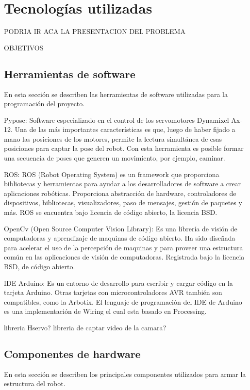 \chapter{Tecnologías utilizadas}\label{chapter:presentacion_del_problema}

 PODRIA IR ACA LA PRESENTACION DEL PROBLEMA
 
 OBJETIVOS
 
\section{ Herramientas de software}
En esta sección se describen las herramientas de software utilizadas para la programación del proyecto.

Pypose: Software especializado en el control de los servomotores Dynamixel Ax-12. Una de las más importantes características es que, luego de haber fijado a mano las posiciones de los motores, permite la lectura simultánea de esas posiciones para captar la pose del robot. Con esta herramienta es posible formar una secuencia de poses que generen un movimiento, por ejemplo, caminar. %

ROS: ROS (Robot Operating System) es un framework que proporciona bibliotecas y herramientas para ayudar a los desarrolladores de software a crear aplicaciones robóticas. Proporciona abstracción de hardware, controladores de dispositivos, bibliotecas, visualizadores, paso de mensajes, gestión de paquetes y más. ROS se encuentra bajo licencia de código abierto, la licencia BSD.

OpenCv (Open Source Computer Vision Library): Es una librería de visión de computadoras y aprendizaje de maquinas de código abierto. Ha sido diseñada para acelerar el uso de la percepción de maquinas y para proveer una estructura común en las aplicaciones de visión de computadoras. Registrada bajo la licencia BSD, de código abierto. 

IDE Arduino: Es un entorno de desarrollo para escribir y cargar código en la tarjeta Arduino. Otras tarjetas con microcontroladores AVR también son compatibles, como la Arbotix. El lenguaje de programación del IDE de Arduino es una implementación de Wiring el cual esta basado en Processing.  %

libreria Hservo?
libreria de captar video de la camara?

\section{Componentes de hardware}
En esta sección se describen los principales componentes utilizados para armar la estructura del robot.

